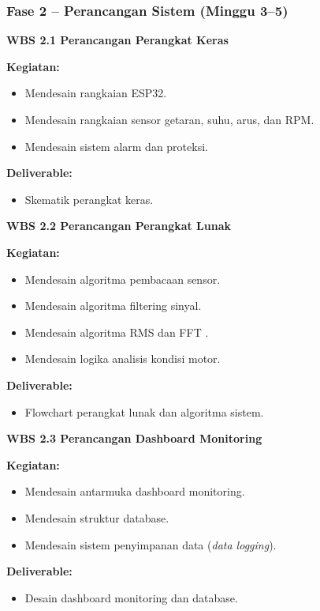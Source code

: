 \documentclass{elsinta}
\begin{document}
\subsubsection*{Fase 2 -- Perancangan Sistem (Minggu 3--5)}

\textbf{WBS 2.1 Perancangan Perangkat Keras}

\textbf{Kegiatan:}
\begin{itemize}
    \item Mendesain rangkaian ESP32.
    \item Mendesain rangkaian sensor getaran, suhu, arus, dan RPM.
    \item Mendesain sistem alarm dan proteksi.
\end{itemize}

\textbf{Deliverable:}
\begin{itemize}
    \item Skematik perangkat keras.
\end{itemize}

\textbf{WBS 2.2 Perancangan Perangkat Lunak}

\textbf{Kegiatan:}
\begin{itemize}
    \item Mendesain algoritma pembacaan sensor.
    \item Mendesain algoritma filtering sinyal.
    \item Mendesain algoritma RMS dan FFT \cite{oppenheim2010,randall2011}.
    \item Mendesain logika analisis kondisi motor.
\end{itemize}

\textbf{Deliverable:}
\begin{itemize}
    \item Flowchart perangkat lunak dan algoritma sistem.
\end{itemize}

\textbf{WBS 2.3 Perancangan Dashboard Monitoring}

\textbf{Kegiatan:}
\begin{itemize}
    \item Mendesain antarmuka dashboard monitoring.
    \item Mendesain struktur database.
    \item Mendesain sistem penyimpanan data (\textit{data logging}).
\end{itemize}

\textbf{Deliverable:}
\begin{itemize}
    \item Desain dashboard monitoring dan database.
\end{itemize}
\end{document}
